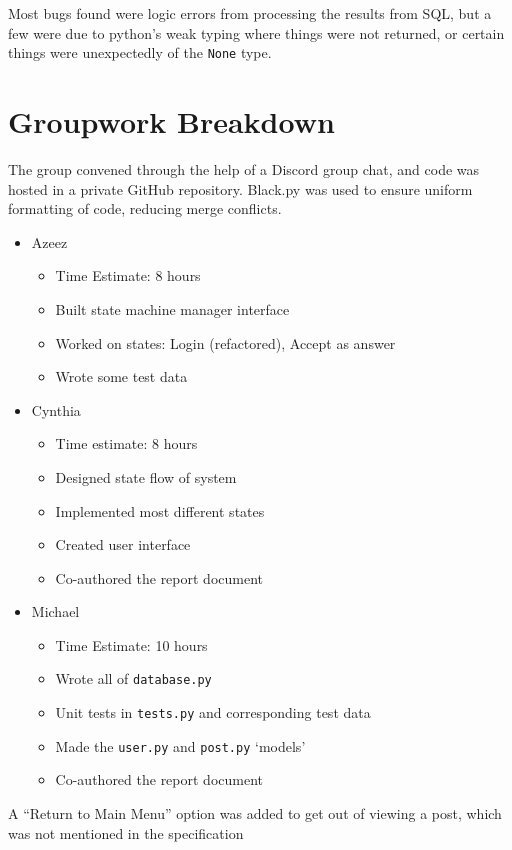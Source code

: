 \documentclass{article}
\begin{document}
Most bugs found were logic errors from processing the results from SQL, but a few were due to python's weak typing where things were not returned, or certain things were unexpectedly of the \verb|None| type.

\section{Groupwork Breakdown}

The group convened through the help of a Discord group chat, and code was hosted in a private GitHub repository. Black.py was used to ensure uniform formatting of code, reducing merge conflicts.

\begin{itemize}
    \item Azeez
          \begin{itemize}
              \item Time Estimate: 8 hours
              \item Built state machine manager interface
              \item Worked on states: Login (refactored), Accept as answer
              \item Wrote some test data
          \end{itemize}
    \item Cynthia
          \begin{itemize}
              \item Time estimate: 8 hours
              \item Designed state flow of system
              \item Implemented most different states
              \item Created user interface
              \item Co-authored the report document
          \end{itemize}
    \item Michael
          \begin{itemize}
              \item Time Estimate: 10 hours
              \item Wrote all of \verb|database.py|
              \item Unit tests in \verb|tests.py| and corresponding test data
              \item Made the \verb|user.py| and \verb|post.py| `models'
              \item Co-authored the report document
          \end{itemize}
\end{itemize}

A ``Return to Main Menu'' option was added to get out of viewing a post, which was not mentioned in the specification
\end{document}

